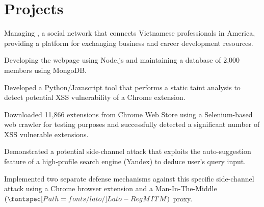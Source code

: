 \documentclass[]{deedy_format_Hien}
\begin{document}
\begin{minipage}[t]{0.66\textwidth}
\section{Projects}
\vspace{1mm}
\justify
\begin{tightemize}
\item Managing , a social network that connects Vietnamese professionals in America, providing a platform for exchanging business and career development resources. 
\item Developing the webpage using Node.js and maintaining a database of 2,000 members using MongoDB.
\end{tightemize}
\vspace{\topsep}
\sectionsep

\vspace{1mm}
\justify
\begin{tightemize}
\item Developed a Python/Javascript tool that performs a static taint analysis to detect potential XSS vulnerability of a Chrome extension. 
\item Downloaded 11,866 extensions from Chrome Web Store using a Selenium-based web crawler for testing purposes and successfully detected a significant number of XSS vulnerable extensions.  
\end{tightemize}
\vspace{\topsep}
\sectionsep


\vspace{1mm}
\justify
\begin{tightemize}
\item Demonstrated a potential side-channel attack that exploits the auto-suggestion feature of a high-profile search engine (Yandex) to deduce user's query input. 
\item Implemented two separate defense mechanisms against this specific side-channel attack using a Chrome browser extension and a Man-In-The-Middle $(\custombold{MITM})$ proxy. 
\end{tightemize}
\vspace{\topsep}
\sectionsep



\end{minipage}
\end{document}
